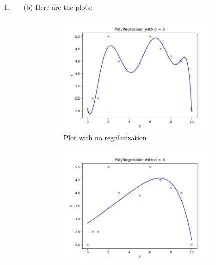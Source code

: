 \documentclass[12pt]{article}
\theoremstyle{definitionstyle}
\begin{document}
\begin{enumerate}[leftmargin=\labelsep]
        \item \begin{enumerate}
            \item[(b)] Here are the plots:
            \begin{figure}[H]
                \centering
                \begin{subfigure}[b]{0.45\textwidth}
                    \includegraphics[width=\textwidth]{no_reg_plot.png}
                    \caption{Plot with no regularization}
                    \label{fig:no_reg_plot}
                \end{subfigure}
                \hfill
                \begin{subfigure}[b]{0.45\textwidth}
                    \includegraphics[width=\textwidth]{reg_1_plot.png}

\end{subfigure}
\end{figure}
\end{enumerate}
\end{enumerate}
\end{document}
